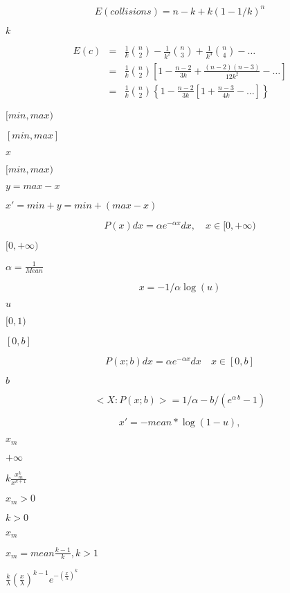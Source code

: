 \documentclass{article}
\begin{document}
\[ E(collisions) = n - k + k (1 - 1/k)^n \]
\pagebreak

$ k $
\pagebreak

\begin{eqnarray*} E(c) &=& \frac{1}{k} \binom{n}{2} - \frac{1}{{{k^2}}} \binom{n}{3} + \frac{1}{{{k^3}}} \binom{n}{4} - \ldots \\ &=& \frac{1}{k} \binom{n}{2} \left[ {1 - \frac{{n - 2}}{{3k}} + \frac{{\left( {n - 2} \right) \left( {n - 3} \right)}}{{12{k^2}}} - \ldots } \right] \\ &=& \frac{1}{k} \binom{n}{2} \left\{ {1 - \frac{{n - 2}}{{3k}} \left[ {1 + \frac{{n - 3}}{{4k}} - \ldots } \right]} \right\} \end{eqnarray*}
\pagebreak

$[min, max)$
\pagebreak

$[min, max]$
\pagebreak

$x$
\pagebreak

$[min,max)$
\pagebreak

$y = max - x$
\pagebreak

$x' = min + y = min + (max - x)$
\pagebreak

\[ P(x) dx = \alpha e^{-\alpha x} dx, \quad x \in [0, +\infty) \]
\pagebreak

$[0, +\infty)$
\pagebreak

$ \alpha = \frac{1}{Mean} $
\pagebreak

\[ x = - 1/\alpha \log(u) \]
\pagebreak

$u$
\pagebreak

$[0,1)$
\pagebreak

$[0,b]$
\pagebreak

\[ P(x; b) dx = \alpha e^{-\alpha x} dx \quad x \in [0,b] \]
\pagebreak

$b$
\pagebreak

\[ <X: P(x; b)> = 1/\alpha - b/(e^{\alpha \, b} -1) \]
\pagebreak

\[ x' = - mean * \log(1 - u), \]
\pagebreak

$x_m$
\pagebreak

$+\infty$
\pagebreak

$ k \frac{x_m^k}{x^{k+1}}$
\pagebreak

$x_m > 0$
\pagebreak

$ k > 0$
\pagebreak

$ x_m $
\pagebreak

$ x_m = mean \frac{k-1}{k}, k > 1$
\pagebreak

$ \frac{k}{\lambda}\left(\frac{x}{\lambda}\right)^{k-1}e^{-\left(\frac{x}{\lambda}\right)^k} $
\pagebreak
\end{document}
